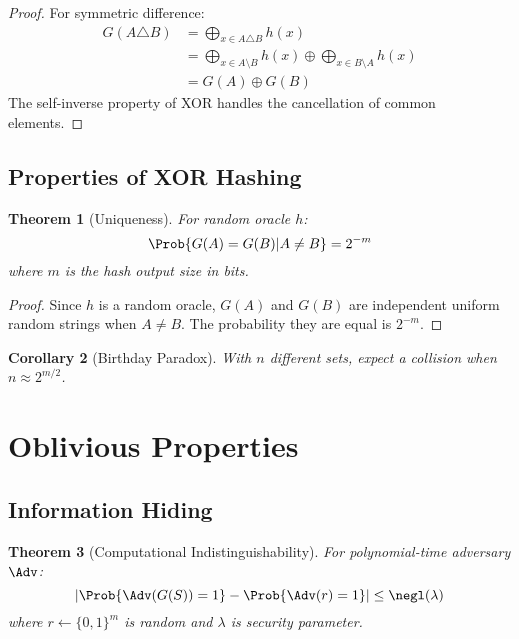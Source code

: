 \documentclass[11pt,final,hidelinks]{article}
\newcommand{\XOR}{\oplus}
\newcommand{\SymDiff}{\triangle}
\newcommand{\BitString}{\{0,1\}^m}
\newtheorem{theorem}{Theorem}[section]
\newtheorem{corollary}[theorem]{Corollary}
\begin{document}
\begin{proof}
For symmetric difference:
\begin{align}
G(A \SymDiff B) &= \bigoplus_{x \in A \SymDiff B} h(x)\\
&= \bigoplus_{x \in A \setminus B} h(x) \XOR \bigoplus_{x \in B \setminus A} h(x)\\
&= G(A) \XOR G(B)
\end{align}
The self-inverse property of XOR handles the cancellation of common elements.
\end{proof}

\subsection{Properties of XOR Hashing}

\begin{theorem}[Uniqueness]
For random oracle $h$:
\begin{equation}
\Prob{G(A) = G(B) | A \neq B} = 2^{-m}
\end{equation}
where $m$ is the hash output size in bits.
\end{theorem}

\begin{proof}
Since $h$ is a random oracle, $G(A)$ and $G(B)$ are independent uniform random strings when $A \neq B$. The probability they are equal is $2^{-m}$.
\end{proof}

\begin{corollary}[Birthday Paradox]
With $n$ different sets, expect a collision when $n \approx 2^{m/2}$.
\end{corollary}

\section{Oblivious Properties}

\subsection{Information Hiding}

\begin{theorem}[Computational Indistinguishability]
For polynomial-time adversary $\Adv$:
\begin{equation}
\left|\Prob{\Adv(G(S)) = 1} - \Prob{\Adv(r) = 1}\right| \leq \negl(\lambda)
\end{equation}
where $r \leftarrow \BitString$ is random and $\lambda$ is security parameter.
\end{theorem}
\end{document}
